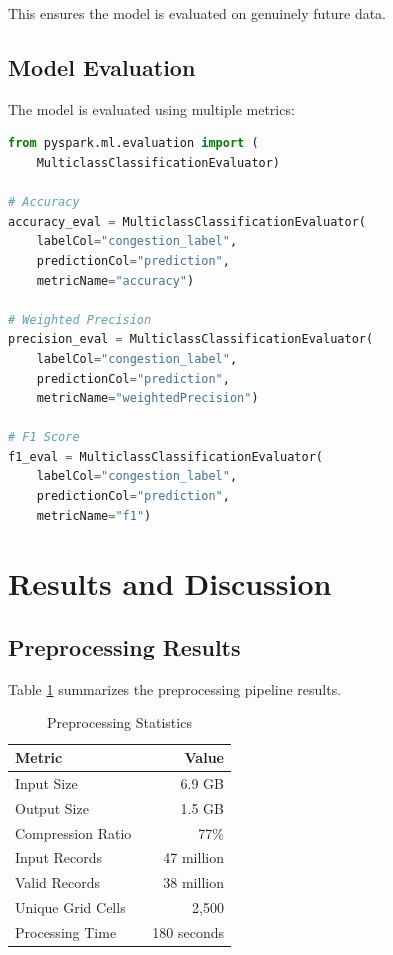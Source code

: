 \documentclass[conference]{IEEEtran}
\begin{document}
This ensures the model is evaluated on genuinely future data.

\subsection{Model Evaluation}

The model is evaluated using multiple metrics:

\begin{lstlisting}[caption={Model Evaluation},language=Python]
from pyspark.ml.evaluation import (
    MulticlassClassificationEvaluator)

# Accuracy
accuracy_eval = MulticlassClassificationEvaluator(
    labelCol="congestion_label",
    predictionCol="prediction",
    metricName="accuracy")

# Weighted Precision
precision_eval = MulticlassClassificationEvaluator(
    labelCol="congestion_label",
    predictionCol="prediction",
    metricName="weightedPrecision")

# F1 Score
f1_eval = MulticlassClassificationEvaluator(
    labelCol="congestion_label",
    predictionCol="prediction",
    metricName="f1")
\end{lstlisting}

\section{Results and Discussion}

\subsection{Preprocessing Results}

Table \ref{tab:preprocessing} summarizes the preprocessing pipeline results.

\begin{table}[htbp]
\caption{Preprocessing Statistics}
\begin{center}
\begin{tabular}{|l|r|}
\hline
\textbf{Metric} & \textbf{Value} \\
\hline
Input Size & 6.9 GB \\
Output Size & 1.5 GB \\
Compression Ratio & 77\% \\
Input Records & ~47 million \\
Valid Records & ~38 million \\
Unique Grid Cells & ~2,500 \\
Processing Time & ~180 seconds \\
\hline
\end{tabular}
\label{tab:preprocessing}
\end{center}
\end{table}
\end{document}
